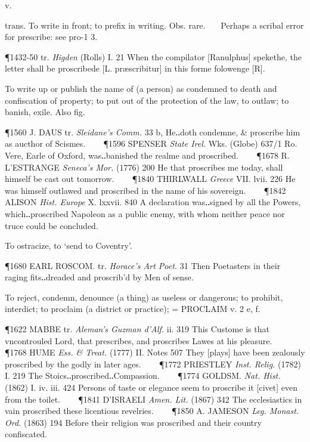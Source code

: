 \begin{description}[wide, labelwidth=!, labelindent=0pt]
 v.

\noindent {}

\vspace{-0.3cm}

\begin{myenumerate}

 trans. To write in front; to prefix in writing. Obs. rare.
   Perhaps a scribal error for prescribe: see pro-1 3.

\P 1432-50 tr.  \textit{Higden} (Rolls) I. 21 When the compilator [Ranulphus] spekethe, the letter shall be proscribede [L. præscribitur] in this forme folowenge [R].

 To write up or publish the name of (a person) as condemned to death and confiscation of property; to put out of the protection of the law, to outlaw; to banish, exile. Also fig.

\P 1560 J. DAUS tr.  \textit{Sleidane's Comm.} 33 b, He‥doth condemne, \& proscribe him as aucthor of Scismes.    
\P 1596 SPENSER  \textit{State Irel.} Wks. (Globe) 637/1 Ro. Vere, Earle of Oxford, was‥banished the realme and proscribed.    
\P 1678 R. L'ESTRANGE  \textit{Seneca's Mor.} (1776) 200 He that proscribes me today, shall himself be cast out tomorrow.    
\P 1840 THIRLWALL  \textit{Greece} VII. lvii. 226 He was himself outlawed and proscribed in the name of his sovereign.    
\P 1842 ALISON  \textit{Hist. Europe} X. lxxvii. 840 A declaration was‥signed by all the Powers, which‥proscribed Napoleon as a public enemy, with whom neither peace nor truce could be concluded.

 To ostracize, to ‘send to Coventry’.

\P 1680 EARL ROSCOM. tr. \textit{Horace's Art Poet.} 31 Then Poetasters in their raging fits‥dreaded and proscrib'd by Men of sense.

 To reject, condemn, denounce (a thing) as useless or dangerous; to prohibit, interdict; to proclaim (a district or practice); = PROCLAIM v. 2 e, f.

\P 1622 MABBE tr.  \textit{Aleman's Guzman d'Alf.} ii. 319 This Custome is that vncontrouled Lord, that prescribes, and proscribes Lawes at his pleasure.    
\P 1768 HUME  \textit{Ess. \& Treat.} (1777) II. Notes 507 They [plays] have been zealously proscribed by the godly in later ages.    
\P 1772 PRIESTLEY  \textit{Inst. Relig.} (1782) I. 219 The Stoics‥proscribed‥Compassion.    
\P 1774 GOLDSM.  \textit{Nat. Hist.} (1862) I. iv. iii. 424 Persons of taste or elegance seem to proscribe it [civet] even from the toilet.    
\P 1841 D'ISRAELI  \textit{Amen. Lit.} (1867) 342 The ecclesiastics in vain proscribed these licentious revelries.    
\P 1850 A. JAMESON  \textit{Leg. Monast. Ord.} (1863) 194 Before their religion was proscribed and their country confiscated.


\end{myenumerate}
\end{description}
